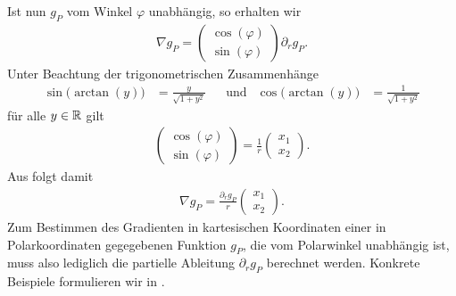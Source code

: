 Ist nun $g_P$ vom Winkel $\varphi$ unabhängig, so erhalten wir
\begin{align}
  \label{eq:gradInPolarCoordinates}
  \nabla g_P 
  = 
  \begin{pmatrix}
    \cos(\varphi)\\
    \sin(\varphi)
  \end{pmatrix}
  \partial_r g_P.
\end{align}
Unter Beachtung der trigonometrischen Zusammenhänge
\begin{align*}
  \sin\big(\arctan(y)\big) &= \frac{y}{\sqrt{1+y^2}} &&\text{und}
  &\cos\big(\arctan(y)\big) &= \frac{1}{\sqrt{1+y^2}}
\end{align*}
für alle $y\in\mathbb{R}$ gilt
\begin{align*}
  \begin{pmatrix}
    \cos(\varphi)\\
    \sin(\varphi)
  \end{pmatrix}
  = 
  \frac{1}{r}
  \begin{pmatrix}
    x_1\\
    x_2
  \end{pmatrix}.
\end{align*}
Aus  folgt damit
\begin{align*}
  \nabla g_P
  = 
  \frac{\partial_r g_P}{r}
  \begin{pmatrix}
    x_1\\
    x_2
  \end{pmatrix}.
\end{align*} 
Zum Bestimmen des Gradienten in kartesischen Koordinaten einer
in Polarkoordinaten gegegebenen Funktion $g_P$, die
vom Polarwinkel unabhängig ist, muss also lediglich 
die partielle Ableitung $\partial_r g_P$ berechnet werden.
Konkrete Beispiele formulieren wir in .
